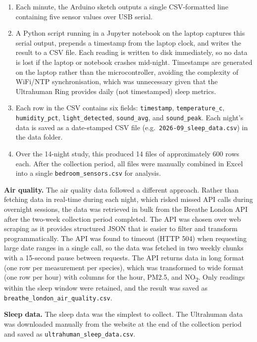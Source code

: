\documentclass[10pt,a4paper]{extarticle}
\begin{document}
\begin{enumerate}[nosep]
    \item Each minute, the Arduino sketch outputs a single CSV-formatted line containing five sensor values over USB serial.
    \item A Python script running in a Jupyter notebook on the laptop captures this serial output, prepends a timestamp from the laptop clock, and writes the result to a CSV file. Each reading is written to disk immediately, so no data is lost if the laptop or notebook crashes mid-night. Timestamps are generated on the laptop rather than the microcontroller, avoiding the complexity of WiFi/NTP synchronisation, which was unnecessary given that the Ultrahuman Ring provides daily (not timestamped) sleep metrics.
    \item Each row in the CSV contains six fields: \texttt{timestamp}, \texttt{temperature\_c}, \texttt{humidity\_pct}, \texttt{light\_\allowbreak detected}, \texttt{sound\_avg}, and \texttt{sound\_peak}. Each night's data is saved as a date-stamped CSV file (e.g.\ \texttt{2026-09\_sleep\_\allowbreak data.csv}) in the data folder.
    \item Over the 14-night study, this produced 14 files of approximately 600 rows each. After the collection period, all files were manually combined in Excel into a single \texttt{bedroom\_sensors.csv} for analysis.
\end{enumerate}

\textbf{Air quality.} The air quality data followed a different approach. Rather than fetching data in real-time during each night, which risked missed API calls during overnight sessions, the data was retrieved in bulk from the Breathe London API after the two-week collection period completed. The API was chosen over web scraping as it provides structured JSON that is easier to filter and transform programmatically. The API was found to timeout (HTTP 504) when requesting large date ranges in a single call, so the data was fetched in two weekly chunks with a 15-second pause between requests. The API returns data in long format (one row per measurement per species), which was transformed to wide format (one row per hour) with columns for the hour, PM2.5, and NO\textsubscript{2}. Only readings within the sleep window were retained, and the result was saved as \texttt{breathe\_london\_air\_quality.csv}.

\textbf{Sleep data.} The sleep data was the simplest to collect. The Ultrahuman data was downloaded manually from the website at the end of the collection period and saved as \texttt{ultrahuman\_sleep\_data.csv}.
\end{document}

